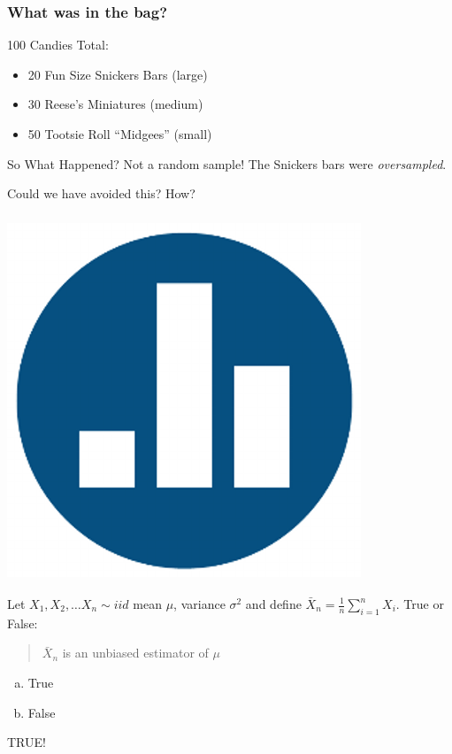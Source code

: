 \documentclass[handout]{beamer}
\begin{document}
\begin{frame}
\frametitle{What was in the bag?}

100 Candies Total:
\begin{itemize}
	\item 20 Fun Size Snickers Bars (large) 
	\item 30 Reese's Miniatures (medium) 
	\item 50 Tootsie Roll ``Midgees'' (small)
\end{itemize}
\begin{block}{So What Happened?}
	\pause Not a random sample! The Snickers bars were \emph{oversampled}.
\end{block}
\begin{block}{Could we have avoided this? How?}

\end{block}
\end{frame}

\begin{frame}
\frametitle{\includegraphics[scale = 0.05]{./images/clicker}}
Let $X_1, X_2, \hdots X_n \sim iid$ mean $\mu$, variance $\sigma^2$ and define $\bar{X}_n = \frac{1}{n}\sum_{i=1}^n X_i$. True or False:

\vspace{1em}
\begin{quotation}
$\bar{X}_n$ is an unbiased estimator of $\mu$
\end{quotation}

\begin{enumerate}[(a)]
\item True
\item False
\end{enumerate}
\pause

\alert{TRUE!}

\end{frame}
\end{document}
